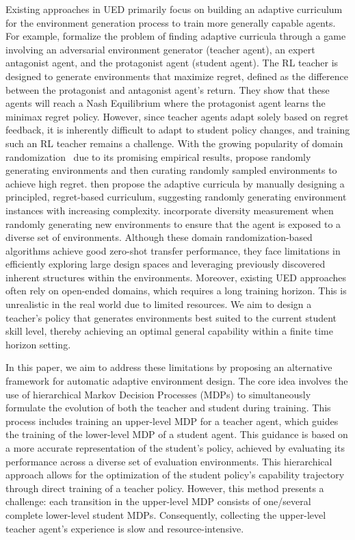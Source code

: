 \documentclass{article}
\begin{document}
Existing approaches in UED primarily focus on building an adaptive curriculum for the environment generation process to train more generally capable agents. For example, \citet{dennis2020emergent} formalize the problem of finding adaptive curricula through a game involving an adversarial environment generator (teacher agent), an expert antagonist agent, and the protagonist agent (student agent). The RL teacher is designed to generate environments that maximize regret, defined as the difference between the protagonist and antagonist agent's return. They show that these agents will reach a Nash Equilibrium where the protagonist agent learns the minimax regret policy.  However, since teacher agents adapt solely based on regret feedback, it is inherently difficult to adapt to student policy changes, and training such an RL teacher remains a challenge. With the growing popularity of domain randomization~\citep{tobin2017domain} due to its promising empirical results, \citet{jiang2021prioritized} propose randomly generating environments and then curating randomly sampled environments to achieve high regret. \citet{parker2022evolving} then propose the adaptive curricula by manually designing a principled, regret-based curriculum, suggesting randomly generating environment instances with increasing complexity. \citet{li2023effective} incorporate diversity measurement when randomly generating new environments to ensure that the agent is exposed to a diverse set of environments. Although these domain randomization-based algorithms achieve good zero-shot transfer performance, they face limitations in efficiently exploring large design spaces and leveraging previously discovered inherent structures within the environments. Moreover, existing UED approaches often rely on open-ended domains, which requires a long training horizon. This is unrealistic in the real world due to limited resources. We aim to design a teacher's policy that generates environments best suited to the current student skill level, thereby achieving an optimal general capability within a finite time horizon setting. 


In this paper, we aim to address these limitations by proposing an alternative framework for automatic adaptive environment design. The core idea involves the use of hierarchical Markov Decision Processes (MDPs) to simultaneously formulate the evolution of both the teacher and student during training. This process includes training an upper-level MDP for a teacher agent, which guides the training of the lower-level MDP of a student agent. This guidance is based on a more accurate representation of the student's policy, achieved by evaluating its performance across a diverse set of evaluation environments. This hierarchical approach allows for the optimization of the student policy's capability trajectory through direct training of a teacher policy. However, this method presents a challenge: each transition in the upper-level MDP consists  of one/several complete lower-level student MDPs. Consequently, collecting the upper-level teacher agent's experience is slow and resource-intensive.
\end{document}

